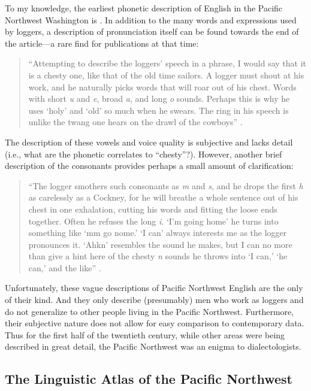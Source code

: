 To my knowledge, the earliest phonetic description of English in the Pacific Northwest Washington is \citet{stevens_1925}. In addition to the many words and expressions used by loggers, a description of pronunciation itself can be found towards the end of the article---a rare find for publications at that time:
\begin{quote}
    ``Attempting to describe the loggers' speech in a phrase, I would say that it is a chesty one, like that of the old time sailors. A logger must shout at his work, and he naturally picks words that will roar out of his chest. Words with short \textit{u} and \textit{e}, broad \textit{a}, and long \textit{o} sounds. Perhaps this is why he uses `holy' and `old' so much when he swears. The ring in his speech is unlike the twang one hears on the drawl of the cowboys'' \citep[139]{stevens_1925}.
\end{quote}
The description of these vowels and voice quality is subjective and lacks detail (i.e., what are the phonetic correlates to ``chesty''?). However, another brief description of the consonants provides perhaps a small amount of clarification:
\begin{quote}
    ``The logger smothers such consonants as \textit{m} and \textit{s}, and he drops the first \textit{h} as carelessly as a Cockney, for he will breathe a whole sentence out of his chest in one exhalation, cutting his words and fitting the loose ends together. Often he refuses the long \textit{i}. `I'm going home' he turns into something like `mm go nome.' `I can' always interests me as the logger pronounces it. `Ahkn' resembles the sound he makes, but I can no more than give a hint here of the chesty \textit{n} sounds he throws into `I can,' `he can,' and the like'' \citep[139]{stevens_1925}.
\end{quote}
Unfortunately, these vague descriptions of Pacific Northwest English are the only of their kind. And they only describe (presumably) men who work as loggers and do not generalize to other people living in the Pacific Northwest. Furthermore, their subjective nature does not allow for easy comparison to contemporary data. Thus for the first half of the twentieth century, while other areas were being described in great detail, the Pacific Northwest was an enigma to dialectologists.

\subsection{The Linguistic Atlas of the Pacific Northwest}

